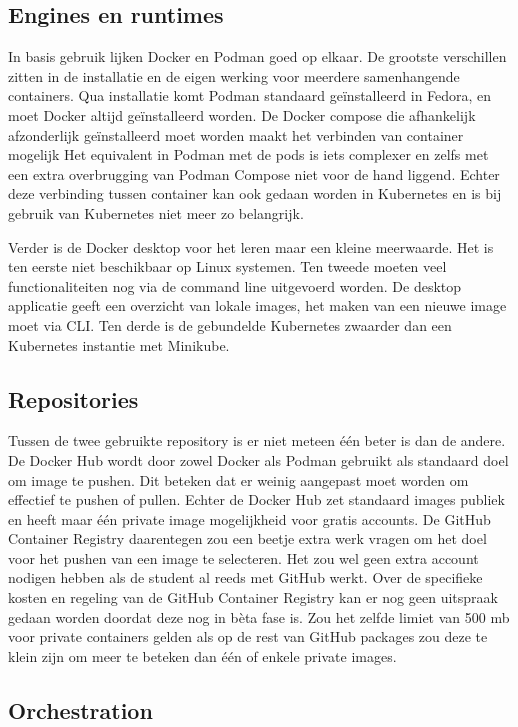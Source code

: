 \subsection{Engines en runtimes}

In basis gebruik lijken Docker en Podman goed op elkaar. De grootste verschillen zitten in de installatie en de eigen werking voor meerdere samenhangende containers. Qua installatie komt Podman standaard geïnstalleerd in Fedora, en moet Docker altijd geïnstalleerd worden. De Docker compose die afhankelijk afzonderlijk geïnstalleerd moet worden maakt het verbinden van container mogelijk  Het equivalent in Podman met de pods is iets complexer en zelfs met een extra overbrugging van Podman Compose niet voor de hand liggend. Echter deze verbinding tussen container kan ook gedaan worden in Kubernetes en is bij gebruik van Kubernetes niet meer zo belangrijk.

Verder is de Docker desktop voor het leren maar een kleine meerwaarde. Het is ten eerste niet beschikbaar op Linux systemen. Ten tweede moeten veel functionaliteiten nog via de command line uitgevoerd worden. De desktop applicatie geeft een overzicht van lokale images, het maken van een nieuwe image moet via CLI. Ten derde is de gebundelde Kubernetes zwaarder dan een Kubernetes instantie met Minikube.

\subsection{Repositories}

Tussen de twee gebruikte repository is er niet meteen één beter is dan de andere. De Docker Hub wordt door zowel Docker als Podman gebruikt als standaard doel om image te pushen. Dit beteken dat er weinig aangepast moet worden om effectief te pushen of pullen. Echter de Docker Hub zet standaard images publiek en heeft maar één private image mogelijkheid voor gratis accounts. De GitHub Container Registry daarentegen zou een beetje extra werk vragen om het doel voor het pushen van een image te selecteren. Het zou wel geen extra account nodigen hebben als de student al reeds met GitHub werkt. Over de specifieke kosten en regeling van de GitHub Container Registry kan er nog geen uitspraak gedaan worden doordat deze nog in bèta fase is. Zou het zelfde limiet  van 500 mb voor private containers gelden als op de rest van GitHub packages zou deze te klein zijn om meer te beteken dan één of enkele private images.

\subsection{Orchestration}

